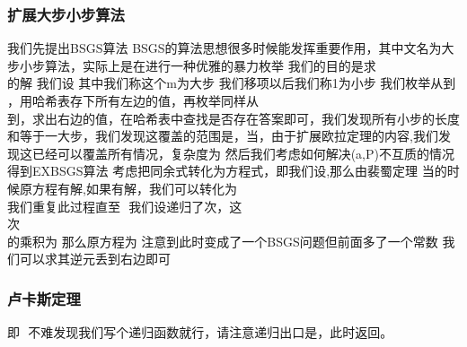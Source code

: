 \documentclass[8pt,a4paper]{article}
\newcommand{\code}[1]{
    
}
\newcommand{\txt}[1]{\par\noindent\footnotesize #1}
\newcommand{\inlineformula}[1]{\ensuremath{}}
\newcommand{\displayformula}[1]{%
    \vspace{0.2em}
    \[
        
    \]
}
\begin{document}
\begin{multicols}{2}
        \subsubsection{扩展大步小步算法}
            \txt{我们先提出BSGS算法
BSGS的算法思想很多时候能发挥重要作用，其中文名为大步小步算法，实际上是在进行一种优雅的暴力枚举
我们的目的是求 \displayformula{./assets/formulas_tex/formula_078.tex}的解\inlineformula{./assets/formulas_tex/formula_079.tex}
我们设\inlineformula{./assets/formulas_tex/formula_080.tex} 其中\inlineformula{./assets/formulas_tex/formula_081.tex}我们称这个m为大步
我们移项以后\inlineformula{./assets/formulas_tex/formula_082.tex}我们称1为小步
我们枚举\inlineformula{./assets/formulas_tex/formula_083.tex}从\inlineformula{./assets/formulas_tex/formula_084.tex}到\inlineformula{./assets/formulas_tex/formula_085.tex}，用哈希表存下所有左边的值，再枚举\inlineformula{./assets/formulas_tex/formula_086.tex}同样从\displayformula{./assets/formulas_tex/formula_087.tex}到\inlineformula{./assets/formulas_tex/formula_088.tex}，求出右边的值，在哈希表中查找是否存在答案即可，我们发现所有小步的长度和等于一大步，我们发现这覆盖的范围是\inlineformula{./assets/formulas_tex/formula_089.tex}，当\inlineformula{./assets/formulas_tex/formula_090.tex}，由于扩展欧拉定理的内容,我们发现这已经可以覆盖所有情况，复杂度为\inlineformula{./assets/formulas_tex/formula_091.tex}
然后我们考虑如何解决(a,P)不互质的情况得到EXBSGS算法
考虑把同余式转化为方程式，即\inlineformula{./assets/formulas_tex/formula_092.tex}我们设\inlineformula{./assets/formulas_tex/formula_093.tex},那么由裴蜀定理
当\inlineformula{./assets/formulas_tex/formula_094.tex}的时候原方程有解,如果有解，我们可以转化为 \displayformula{./assets/formulas_tex/formula_095.tex} 我们重复此过程直至
\inlineformula{./assets/formulas_tex/formula_096.tex}  我们设递归了\inlineformula{./assets/formulas_tex/formula_097.tex}次，这\displayformula{./assets/formulas_tex/formula_098.tex}次\displayformula{./assets/formulas_tex/formula_099.tex}的乘积为\inlineformula{./assets/formulas_tex/formula_100.tex}
那么原方程为\inlineformula{./assets/formulas_tex/formula_101.tex} 注意到此时变成了一个BSGS问题但前面多了一个常数
我们可以求其逆元丢到右边即可}
            \code{src/number_theory/数论定理_9_5.cpp}
        \subsubsection{卢卡斯定理}
            \txt{即 \inlineformula{./assets/formulas_tex/formula_102.tex}
不难发现我们写个递归函数就行，请注意递归出口是\inlineformula{./assets/formulas_tex/formula_103.tex}，此时返回\inlineformula{./assets/formulas_tex/formula_104.tex}。}

\end{multicols}
\end{document}
